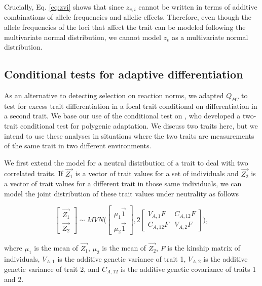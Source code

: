 \documentclass[11pt,letterpaper]{article}
\begin{document}
Crucially, Eq. \ref{eq:zvi} shows that since $z_{v,i}$ cannot be written in terms of additive combinations of allele frequencies and allelic effects.
Therefore, even though the allele frequencies of the loci that affect the trait can be modeled following the multivariate normal distribution, we cannot model $z_{v}$ as a multivariate normal distribution.


\subsection*{Conditional tests for adaptive differentiation}
As an alternative to detecting selection on reaction norms, we adapted $Q_{PC}$ to test for excess trait differentiation in a focal trait conditional on differentiation in a second trait.
We base our use of the conditional test on \cite{Berg2017}, who developed a two-trait conditional test for polygenic adaptation.
We discuss two traits here, but we intend to use these analyses in situations where the two traits are measurements of the same trait in two different environments.

We first extend the model for a neutral distribution of a trait to deal with two correlated traits.
If $\vec{Z_{1}}$ is a vector of trait values for a set of individuals and $\vec{Z_{2}}$ is a vector of trait values for a different trait in those same individuals, we can model the joint distribution of these trait values under neutrality as follows

\begin{equation}\label{eqn:mvn2trait}
  \begin{bmatrix}
\vec{Z_{1}} \\ \vec{Z_{2}}
  \end{bmatrix} \sim MVN\bigg(
  \begin{bmatrix}  \mu_{1}\vec{1}\\ \mu_{2}\vec{1} \end{bmatrix}, 2
   \begin{bmatrix} V_{A,1}F & C_{A,12}F\\ C_{A, 12}F & V_{A,2}F
    \end{bmatrix}\bigg),
\end{equation}

where $\mu_{1}$ is the mean of $\vec{Z_{1}}$, $\mu_{2}$ is the mean of $\vec{Z_{2}}$, $F$ is the kinship matrix of individuals, $V_{A,1}$ is the additive genetic variance of trait 1, $V_{A,2}$ is the additive genetic variance of trait 2, and $C_{A,12}$ is the additive genetic covariance of traits 1 and 2.
\end{document}
